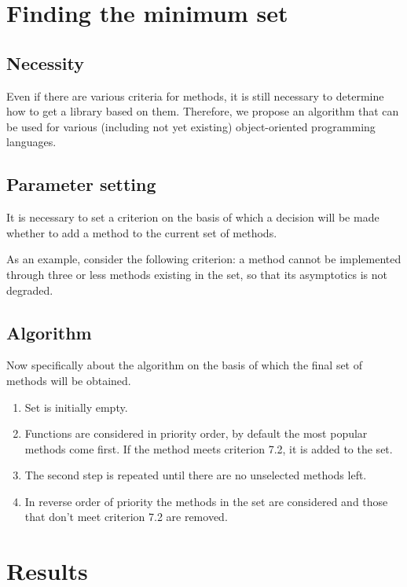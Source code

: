 \documentclass[anonymous,sigplan,review,11pt,nonacm,natbib=false]{acmart}
\begin{document}
\section{Finding the minimum set}

\subsection{Necessity}

Even if there are various criteria for methods, it is still necessary to determine how to get a library based on them. Therefore, we propose an algorithm that can be used for various (including not yet existing) object-oriented programming languages.

\subsection{Parameter setting}

It is necessary to set a criterion on the basis of which a decision will be made whether to add a method to the current set of methods.

As an example, consider the following criterion: a method cannot be implemented through three or less methods existing in the set, so that its asymptotics is not degraded.

\subsection{Algorithm}

Now specifically about the algorithm on the basis of which the final set of methods will be obtained.

\begin{enumerate}
    \item Set is initially empty.
    \item Functions are considered in priority order, by default the most popular methods come first. If the method meets criterion 7.2, it is added to the set.
    \item The second step is repeated until there are no unselected methods left.
    \item In reverse order of priority the methods in the set are considered and those that don't meet criterion 7.2 are removed.
\end{enumerate}

\section{Results}
\end{document}
